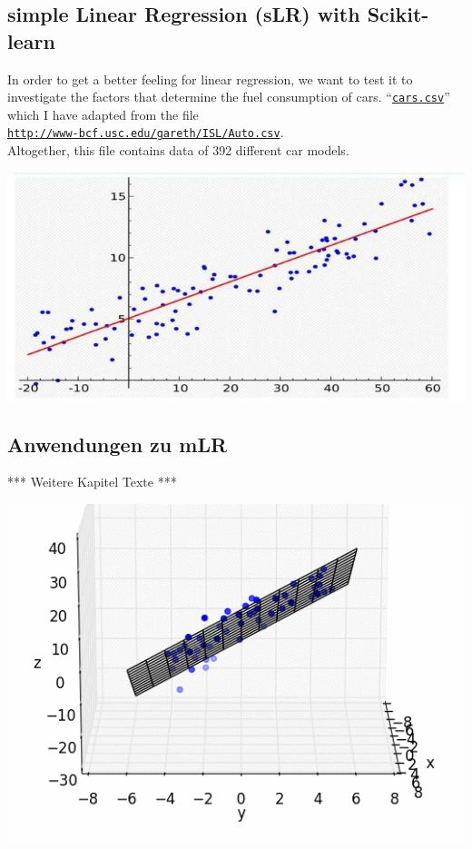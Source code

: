 \documentclass[12pt]{article}
\begin{document}
\subsection{simple Linear Regression (sLR) with Scikit-learn}

In order to get a better feeling for linear regression, we want to test it to investigate the factors that determine the fuel consumption of cars.  %
``\href{https://github.com/karlstroetmann/Artificial-Intelligence/blob/master/SetlX/cars.csv}{\texttt{cars.csv}}''
which I have adapted from the file
\\[0.2cm]
\hspace*{1.3cm}
\href{http://www-bcf.usc.edu/~gareth/ISL/Auto.csv}{\texttt{http://www-bcf.usc.edu/gareth/ISL/Auto.csv}}.
\\[0.2cm]
Altogether, this file contains data of 392 different car models.
\\[0.1cm]
\hspace*{0.2cm}
\begin{center}
\includegraphics{sLR-Gerade} 
\end{center}

\subsection{Anwendungen zu mLR}

*** Weitere Kapitel Texte ***

\includegraphics{ML5-MovingPicture_mLR}\\
\end{document}
